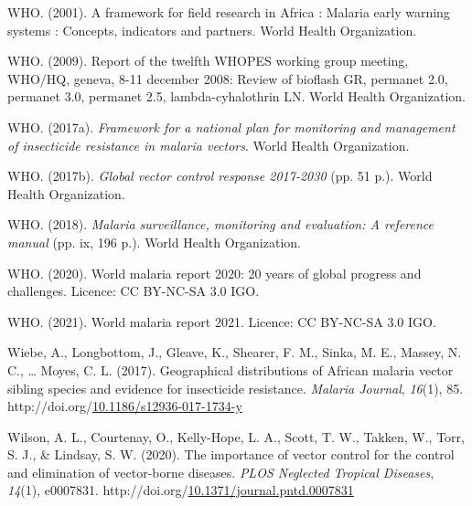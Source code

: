 \documentclass[12pt,twoside]{reedthesis}
\newlength{\cslhangindent}
\newenvironment{CSLReferences}[2] %
 {%
  \setlength{\parindent}{0pt}
  \ifodd #1 \everypar{\setlength{\hangindent}{\cslhangindent}}\ignorespaces\fi
  \ifnum #2 > 0
  \setlength{\parskip}{#2\baselineskip}
  \fi
 }%
 {}
\begin{document}
\begin{CSLReferences}{1}{0}
\leavevmode{}%
WHO. (2001). A framework for field research in {Africa} : Malaria early warning systems : Concepts, indicators and partners. World Health Organization.

\leavevmode{}%
WHO. (2009). Report of the twelfth WHOPES working group meeting, WHO/HQ, geneva, 8-11 december 2008: Review of bioflash GR, permanet 2.0, permanet 3.0, permanet 2.5, lambda-cyhalothrin LN. World Health Organization.

\leavevmode{}%
WHO. (2017a). \emph{Framework for a national plan for monitoring and management of insecticide resistance in malaria vectors}. World Health Organization.

\leavevmode{}%
WHO. (2017b). \emph{Global vector control response 2017-2030} (pp. 51 p.). World Health Organization.

\leavevmode{}%
WHO. (2018). \emph{Malaria surveillance, monitoring and evaluation: A reference manual} (pp. ix, 196 p.). World Health Organization.

\leavevmode{}%
WHO. (2020). World malaria report 2020: 20 years of global progress and challenges. Licence: CC BY-NC-SA 3.0 IGO.

\leavevmode{}%
WHO. (2021). World malaria report 2021. Licence: CC BY-NC-SA 3.0 IGO.

\leavevmode{}%
Wiebe, A., Longbottom, J., Gleave, K., Shearer, F. M., Sinka, M. E., Massey, N. C., \ldots{} Moyes, C. L. (2017). Geographical distributions of {African} malaria vector sibling species and evidence for insecticide resistance. \emph{Malaria Journal}, \emph{16}(1), 85. http://doi.org/\href{https://doi.org/10.1186/s12936-017-1734-y}{10.1186/s12936-017-1734-y}

\leavevmode{}%
Wilson, A. L., Courtenay, O., Kelly-Hope, L. A., Scott, T. W., Takken, W., Torr, S. J., \& Lindsay, S. W. (2020). The importance of vector control for the control and elimination of vector-borne diseases. \emph{PLOS Neglected Tropical Diseases}, \emph{14}(1), e0007831. http://doi.org/\href{https://doi.org/10.1371/journal.pntd.0007831}{10.1371/journal.pntd.0007831}


\end{CSLReferences}
\end{document}

